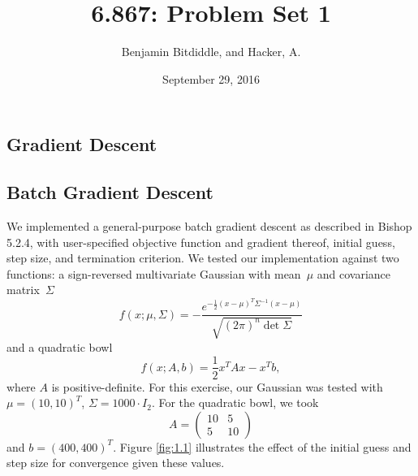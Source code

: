 \documentclass{article}
\title{6.867: Problem Set 1}
\author{Benjamin Bitdiddle, and Hacker, A.}
\date{September 29, 2016}
\begin{document}

\maketitle

\begin{multicols}{2}

\section{Gradient Descent}

\subsection{Batch Gradient Descent}

We implemented a general-purpose batch gradient descent as described in Bishop 5.2.4, with user-specified objective function and gradient thereof, initial guess, step size, and termination criterion. %
We tested our implementation against two functions: a sign-reversed multivariate Gaussian with mean~$\mu$ and covariance matrix~$\Sigma$
\begin{equation}
f(x; \mu, \Sigma) = -\frac{e^{-\frac12(x - \mu)^T \Sigma^{-1}(x - \mu)}}{\sqrt{(2\pi)^n \det\Sigma}}
\end{equation}
and a quadratic bowl
\begin{equation}
f(x; A, b) = \frac{1}{2}x^T Ax - x^T b,
\end{equation}
where $A$ is positive-definite. For this exercise, our Gaussian was tested with $\mu = (10, 10)^T$, $\Sigma = 1000 \cdot I_2$. For the quadratic bowl, we took \[A = \left(\begin{array}{cc}10 & 5 \\5 & 10\end{array}\right)\] and $b = (400, 400)^T$. Figure \ref{fig:1.1} illustrates the effect of the initial guess and step size for convergence given these values.


\end{multicols}
\end{document}
